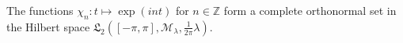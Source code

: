 The functions $\chi_n: t \mapsto \exp(int)$ for $n \in \mathbb{Z}$ form a complete orthonormal set in the Hilbert space $\mathfrak{L}_2([-\pi, \pi], \mathcal{M}_{\lambda}, \frac{1}{2\pi} \lambda)$.
